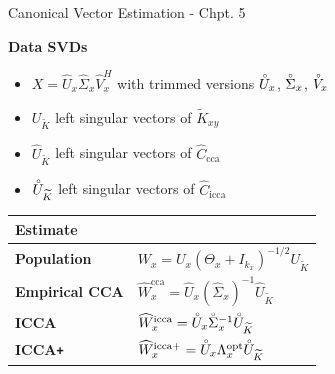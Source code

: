 \documentclass[8pt]{beamer}
\newcommand{\Ux}{U_x}
\newcommand{\kx}{k_x}
\newcommand{\Uxhat}{\widehat{U}_x}
\newcommand{\Sigxhat}{\widehat{\Sigma}_x}
\newcommand{\Vxhat}{\widehat{V}_x}
\newcommand{\Uxcir}{\accentset{\circ}{U}_x}
\newcommand{\Ukcir}{\accentset{\circ}{U}_{\widetilde{K}}}
\newcommand{\Sigxcir}{\accentset{\circ}{\Sigma}_x}
\newcommand{\Vxcir}{\accentset{\circ}{V}_x}
\newcommand{\Tx}{\Theta_x}
\newcommand{\Kxytil}{\widetilde{K}_{xy}}
\newcommand{\Uktil}{U_{\widetilde{K}}}
\newcommand{\Cccahat}{\widehat{C}_{\text{cca}}}
\newcommand{\Ciccahat}{\widehat{C}_{\text{icca}}}
\newcommand{\iccap}{ICCA\texttt{+} }
\begin{document}
\begin{frame}{Canonical Vector Estimation - Chpt. 5}

\textbf{Data SVDs}
\begin{itemize}
\item $X=\Uxhat\Sigxhat\Vxhat^H$ with trimmed versions $\Uxcir$, $\Sigxcir$, $\Vxcir$
\item $\Uktil$ left singular vectors of $\Kxytil$
\item $\widehat{U}_{\widetilde{K}}$ left singular vectors of $\Cccahat$
\item $\Ukcir$ left singular vectors of $\Ciccahat$
\end{itemize}

\vspace{3ex}

\begin{table}[t]
\centering
\begin{tabular}{l|l}\toprule
Estimate & \\
\midrule
\textbf{Population}  & $W_x = \Ux\left(\Tx + I_{\kx}\right)^{-1/2}\Uktil$\\[1ex]
\textbf{Empirical CCA} & $\widehat{W}_x^{\text{cca}} =
\Uxhat\left(\Sigxhat\right)^{-1}\widehat{U}_{\widetilde{K}}$\\[1ex]
\textbf{ICCA} & $\widehat{W}_x^{\text{icca}} = \Uxcir\Sigxcir^{-1}\Ukcir$\\[1ex]
\textbf{\iccap} &$\widehat{W}_x^{\text{icca+}} = \Uxcir\Lambda_x^{\text{opt}}\Ukcir$\\[1ex]
\bottomrule
\end{tabular}
\end{table}

\end{frame}
\end{document}
